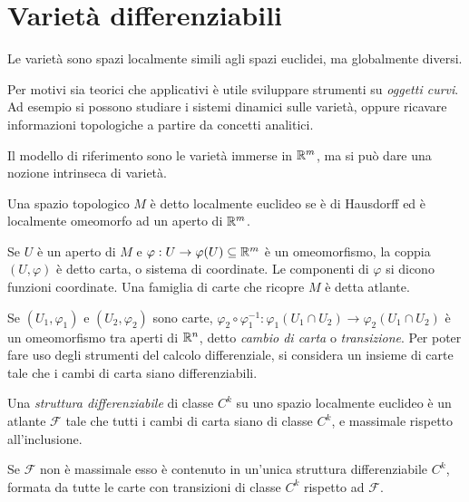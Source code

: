 \chapter{Varietà differenziabili}
 
 Le varietà sono spazi localmente simili agli spazi euclidei, ma globalmente diversi.
 
 Per motivi sia teorici che applicativi è utile sviluppare strumenti su \emph{oggetti curvi}.
 Ad esempio si possono studiare i sistemi dinamici sulle varietà, oppure ricavare
 informazioni topologiche a partire da concetti analitici.
 
 Il modello di riferimento sono le varietà immerse in $\mathbb R^m$, ma si può dare
 una nozione intrinseca di varietà.
 
 \begin{definition}
 Una spazio topologico $M$ è detto localmente euclideo se è
 di Hausdorff ed è localmente omeomorfo ad un aperto di $\mathbb R^m$.
 \end{definition}
 
 \begin{definition}
 Se $U$ è un aperto di $M$ e $\varphi:U\to \varphi(U)\subseteq \mathbb R^m$
 è un omeomorfismo, la coppia $(U, \varphi)$ è detto carta, o sistema di coordinate.
 Le componenti di $\varphi$ si dicono funzioni coordinate. Una famiglia di carte
 che ricopre $M$ è detta atlante.
 \end{definition}
 
 Se $(U_1, \varphi_1)$ e $(U_2, \varphi_2)$ sono carte, $\varphi_2\circ\varphi_1^{-1}:\varphi_1(U_1\cap U_2)\to\varphi_2(U_1\cap U_2)$
 è un omeomorfismo tra aperti di $\mathbb R^n$, detto \emph{cambio di carta} o \emph{transizione}.
 Per poter fare uso degli strumenti del calcolo differenziale, si considera un insieme
 di carte tale che i cambi di carta siano differenziabili.
 
 \begin{definition}
 Una \emph{struttura differenziabile} di classe $C^k$ su uno
 spazio localmente euclideo è un atlante $\mathcal F$ tale che tutti i cambi di carta siano
 di classe $C^k$, e massimale rispetto all'inclusione.
 \end{definition}
 
 \begin{remark}
  Se $\mathcal F$ non è massimale esso è contenuto in un'unica struttura differenziabile $C^k$,
  formata da tutte le carte con transizioni di classe $C^k$ rispetto ad $\mathcal F$.
 \end{remark}
 
